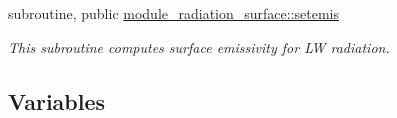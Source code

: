 {\bf }\par
\begin{DoxyCompactItemize}
\item 
subroutine, public \hyperlink{namespacemodule__radiation__surface_a0fdd0e9a9c536d3d41bd6b6c9d0a8675}{module\+\_\+radiation\+\_\+surface\+::setemis}                                                                                             
\begin{DoxyCompactList}\small\item\em This subroutine computes surface emissivity for LW radiation. \end{DoxyCompactList}\end{DoxyCompactItemize}

\subsection*{Variables}
